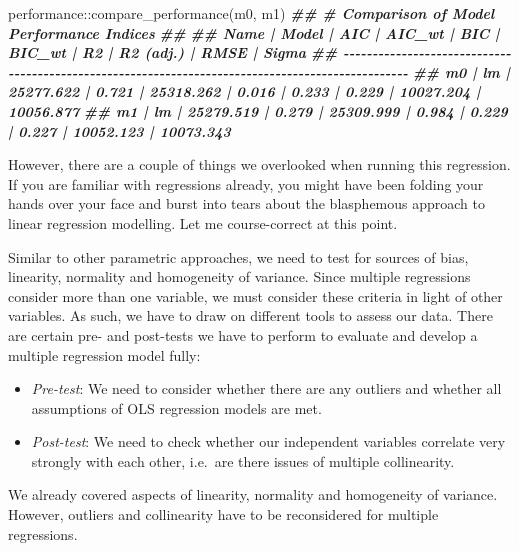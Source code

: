 \documentclass[
]{book}
\newenvironment{Shaded}{\begin{snugshade}}{\end{snugshade}}
\newcommand{\DocumentationTok}[1]{\textcolor[rgb]{0.56,0.35,0.01}{\textbf{\textit{#1}}}}
\newcommand{\FunctionTok}[1]{\textcolor[rgb]{0.00,0.00,0.00}{#1}}
\newcommand{\NormalTok}[1]{#1}
\newcommand{\SpecialCharTok}[1]{\textcolor[rgb]{0.00,0.00,0.00}{#1}}
\begin{document}
\begin{Shaded}
\begin{Highlighting}[]
\NormalTok{performance}\SpecialCharTok{::}\FunctionTok{compare\_performance}\NormalTok{(m0, m1)}
\DocumentationTok{\#\# \# Comparison of Model Performance Indices}
\DocumentationTok{\#\# }
\DocumentationTok{\#\# Name | Model |       AIC | AIC\_wt |       BIC | BIC\_wt |    R2 | R2 (adj.) |      RMSE |     Sigma}
\DocumentationTok{\#\# {-}{-}{-}{-}{-}{-}{-}{-}{-}{-}{-}{-}{-}{-}{-}{-}{-}{-}{-}{-}{-}{-}{-}{-}{-}{-}{-}{-}{-}{-}{-}{-}{-}{-}{-}{-}{-}{-}{-}{-}{-}{-}{-}{-}{-}{-}{-}{-}{-}{-}{-}{-}{-}{-}{-}{-}{-}{-}{-}{-}{-}{-}{-}{-}{-}{-}{-}{-}{-}{-}{-}{-}{-}{-}{-}{-}{-}{-}{-}{-}{-}{-}{-}{-}{-}{-}{-}{-}{-}{-}{-}{-}{-}{-}{-}{-}{-}{-}}
\DocumentationTok{\#\# m0   |    lm | 25277.622 |  0.721 | 25318.262 |  0.016 | 0.233 |     0.229 | 10027.204 | 10056.877}
\DocumentationTok{\#\# m1   |    lm | 25279.519 |  0.279 | 25309.999 |  0.984 | 0.229 |     0.227 | 10052.123 | 10073.343}
\end{Highlighting}
\end{Shaded}

However, there are a couple of things we overlooked when running this regression. If you are familiar with regressions already, you might have been folding your hands over your face and burst into tears about the blasphemous approach to linear regression modelling. Let me course-correct at this point.

Similar to other parametric approaches, we need to test for sources of bias, linearity, normality and homogeneity of variance. Since multiple regressions consider more than one variable, we must consider these criteria in light of other variables. As such, we have to draw on different tools to assess our data. There are certain pre- and post-tests we have to perform to evaluate and develop a multiple regression model fully:

\begin{itemize}
\item
  \emph{Pre-test}: We need to consider whether there are any outliers and whether all assumptions of OLS regression models are met.
\item
  \emph{Post-test}: We need to check whether our independent variables correlate very strongly with each other, i.e.~are there issues of multiple collinearity.
\end{itemize}

We already covered aspects of linearity, normality and homogeneity of variance. However, outliers and collinearity have to be reconsidered for multiple regressions.
\end{document}
